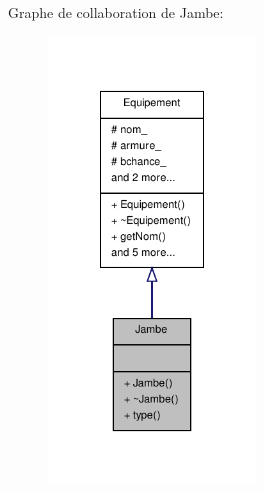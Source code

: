Graphe de collaboration de Jambe\-:
\nopagebreak
\begin{figure}[H]
\begin{center}
\leavevmode
\includegraphics[width=156pt]{class_jambe__coll__graph}
\end{center}
\end{figure}
